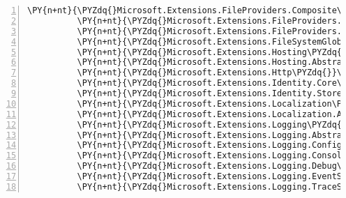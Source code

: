 \begin{Verbatim}[commandchars=\\\{\},numbers=left,firstnumber=1,stepnumber=1,numberblanklines=0]
          \PY{n+nt}{\PYZdq{}Microsoft.Extensions.FileProviders.Composite\PYZdq{}}\PY{p}{:} \PY{l+s+s2}{\PYZdq{}2.1.0\PYZhy{}rc1\PYZhy{}final\PYZdq{}}\PY{p}{,}
          \PY{n+nt}{\PYZdq{}Microsoft.Extensions.FileProviders.Embedded\PYZdq{}}\PY{p}{:} \PY{l+s+s2}{\PYZdq{}2.1.0\PYZhy{}rc1\PYZhy{}final\PYZdq{}}\PY{p}{,}
          \PY{n+nt}{\PYZdq{}Microsoft.Extensions.FileProviders.Physical\PYZdq{}}\PY{p}{:} \PY{l+s+s2}{\PYZdq{}2.1.0\PYZhy{}rc1\PYZhy{}final\PYZdq{}}\PY{p}{,}
          \PY{n+nt}{\PYZdq{}Microsoft.Extensions.FileSystemGlobbing\PYZdq{}}\PY{p}{:} \PY{l+s+s2}{\PYZdq{}2.1.0\PYZhy{}rc1\PYZhy{}final\PYZdq{}}\PY{p}{,}
          \PY{n+nt}{\PYZdq{}Microsoft.Extensions.Hosting\PYZdq{}}\PY{p}{:} \PY{l+s+s2}{\PYZdq{}2.1.0\PYZhy{}rc1\PYZhy{}final\PYZdq{}}\PY{p}{,}
          \PY{n+nt}{\PYZdq{}Microsoft.Extensions.Hosting.Abstractions\PYZdq{}}\PY{p}{:} \PY{l+s+s2}{\PYZdq{}2.1.0\PYZhy{}rc1\PYZhy{}final\PYZdq{}}\PY{p}{,}
          \PY{n+nt}{\PYZdq{}Microsoft.Extensions.Http\PYZdq{}}\PY{p}{:} \PY{l+s+s2}{\PYZdq{}2.1.0\PYZhy{}rc1\PYZhy{}final\PYZdq{}}\PY{p}{,}
          \PY{n+nt}{\PYZdq{}Microsoft.Extensions.Identity.Core\PYZdq{}}\PY{p}{:} \PY{l+s+s2}{\PYZdq{}2.1.0\PYZhy{}rc1\PYZhy{}final\PYZdq{}}\PY{p}{,}
          \PY{n+nt}{\PYZdq{}Microsoft.Extensions.Identity.Stores\PYZdq{}}\PY{p}{:} \PY{l+s+s2}{\PYZdq{}2.1.0\PYZhy{}rc1\PYZhy{}final\PYZdq{}}\PY{p}{,}
          \PY{n+nt}{\PYZdq{}Microsoft.Extensions.Localization\PYZdq{}}\PY{p}{:} \PY{l+s+s2}{\PYZdq{}2.1.0\PYZhy{}rc1\PYZhy{}final\PYZdq{}}\PY{p}{,}
          \PY{n+nt}{\PYZdq{}Microsoft.Extensions.Localization.Abstractions\PYZdq{}}\PY{p}{:} \PY{l+s+s2}{\PYZdq{}2.1.0\PYZhy{}rc1\PYZhy{}final\PYZdq{}}\PY{p}{,}
          \PY{n+nt}{\PYZdq{}Microsoft.Extensions.Logging\PYZdq{}}\PY{p}{:} \PY{l+s+s2}{\PYZdq{}2.1.0\PYZhy{}rc1\PYZhy{}final\PYZdq{}}\PY{p}{,}
          \PY{n+nt}{\PYZdq{}Microsoft.Extensions.Logging.Abstractions\PYZdq{}}\PY{p}{:} \PY{l+s+s2}{\PYZdq{}2.1.0\PYZhy{}rc1\PYZhy{}final\PYZdq{}}\PY{p}{,}
          \PY{n+nt}{\PYZdq{}Microsoft.Extensions.Logging.Configuration\PYZdq{}}\PY{p}{:} \PY{l+s+s2}{\PYZdq{}2.1.0\PYZhy{}rc1\PYZhy{}final\PYZdq{}}\PY{p}{,}
          \PY{n+nt}{\PYZdq{}Microsoft.Extensions.Logging.Console\PYZdq{}}\PY{p}{:} \PY{l+s+s2}{\PYZdq{}2.1.0\PYZhy{}rc1\PYZhy{}final\PYZdq{}}\PY{p}{,}
          \PY{n+nt}{\PYZdq{}Microsoft.Extensions.Logging.Debug\PYZdq{}}\PY{p}{:} \PY{l+s+s2}{\PYZdq{}2.1.0\PYZhy{}rc1\PYZhy{}final\PYZdq{}}\PY{p}{,}
          \PY{n+nt}{\PYZdq{}Microsoft.Extensions.Logging.EventSource\PYZdq{}}\PY{p}{:} \PY{l+s+s2}{\PYZdq{}2.1.0\PYZhy{}rc1\PYZhy{}final\PYZdq{}}\PY{p}{,}
          \PY{n+nt}{\PYZdq{}Microsoft.Extensions.Logging.TraceSource\PYZdq{}}\PY{p}{:} \PY{l+s+s2}{\PYZdq{}2.1.0\PYZhy{}rc1\PYZhy{}final\PYZdq{}}\PY{p}{,}

\end{Verbatim}
